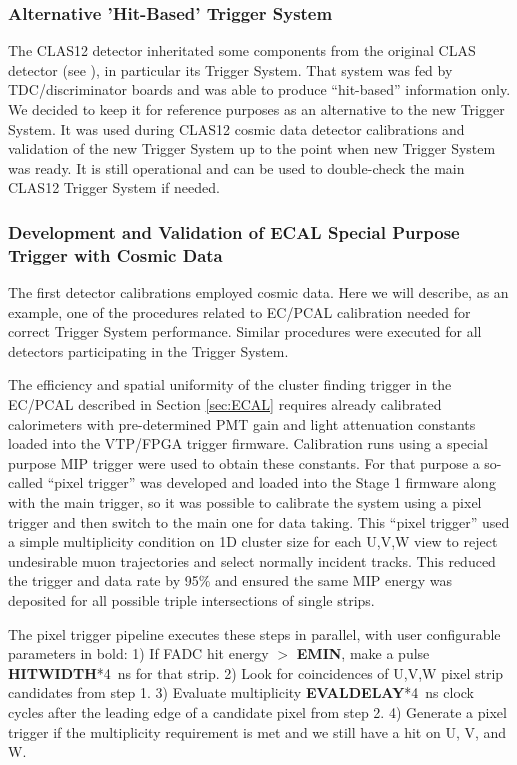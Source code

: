 \subsubsection{Alternative 'Hit-Based' Trigger System}

The CLAS12 detector inheritated some components from the original CLAS detector (see \cite{clas-nim}), in particular its Trigger System. That system was fed by TDC/discriminator boards and was able to produce ``hit-based'' information only. We decided to keep it for reference purposes as an alternative to the new Trigger System. It was used during CLAS12 cosmic data detector calibrations and validation of the new Trigger System up to the point when new Trigger System was ready. It is still operational and can be used to double-check the main CLAS12 Trigger System if needed.

\subsubsection{Development and Validation of ECAL Special Purpose Trigger with Cosmic Data}

The first detector calibrations employed cosmic data. Here we will describe, as an example, one of the procedures related to EC/PCAL calibration needed for correct Trigger System performance. Similar procedures were executed for all detectors participating in the Trigger System.

The efficiency and spatial uniformity of the cluster finding trigger in the EC/PCAL described in Section \ref{sec:ECAL} requires already calibrated calorimeters with pre-determined PMT gain and light attenuation constants loaded into the VTP/FPGA trigger firmware.  Calibration runs using a special purpose MIP trigger were used to obtain these constants. For that purpose a so-called ``pixel trigger'' was developed and loaded into the Stage 1 firmware along with the main trigger, so it was possible to calibrate the system using a pixel trigger and then switch to the main one for data taking. This ``pixel trigger'' used a simple multiplicity condition on 1D cluster size for each U,V,W view to reject undesirable muon trajectories and select normally incident tracks.  This reduced the trigger and data rate by 95$\%$ and ensured the same MIP energy was deposited for all possible triple intersections of single strips.

The pixel trigger pipeline executes these steps in parallel, with user configurable parameters in bold:
  1) If FADC hit energy $>$ \textbf{EMIN}, make a pulse \textbf{HITWIDTH}*4~ns for that strip.
  2) Look for coincidences of U,V,W pixel strip candidates from step 1.
  3) Evaluate multiplicity \textbf{EVALDELAY}*4~ns clock cycles after the leading edge of a candidate pixel from step 2.
  4) Generate a pixel trigger if the multiplicity requirement is met and we still have a hit on U, V, and W. 

